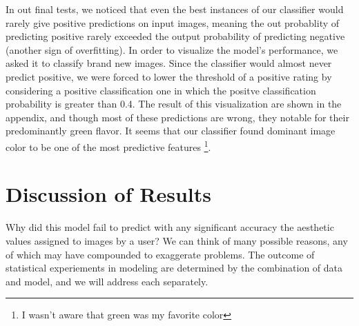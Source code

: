 \documentclass[midd]{thesis}
\begin{document}
In out final tests, we noticed that even the best instances of our classifier would rarely give positive predictions on input images, meaning the out probablity of predicting positive rarely exceeded the output probability of predicting negative (another sign of overfitting). In order to visualize the model's performance, we asked it to classify brand new images. Since the classifier would almost never predict positive, we were forced to lower the threshold of a positive rating by considering a positive classification one in which the positve classification probability is greater than 0.4. The result of this visualization are shown in the appendix, and though most of these predictions are wrong, they notable for their predominantly green flavor. It seems that our classifier found dominant image color to be one of the most predictive features \footnote{I wasn't aware that green was my favorite color}.































\chapter{Discussion of Results}

Why did this model fail to predict with any significant accuracy the aesthetic values assigned to images by a user? We can think of many possible reasons, any of which may have compounded to exaggerate problems. The outcome of statistical experiements in modeling are determined by the combination of data and model, and we will address each separately.
\end{document}
